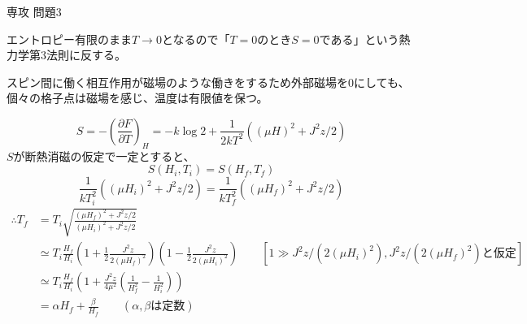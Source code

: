 \documentclass[fleqn]{jbook}
\begin{document}
\begin{answer}{専攻 問題3}
\begin{subanswers}
\SubAnswer
	エントロピー有限のまま$T \to 0$となるので「$T=0$のとき$S=0$である」という熱力学第3法則に反する。

\SubAnswer
スピン間に働く相互作用が磁場のような働きをするため外部磁場を0にしても、個々の格子点は磁場を感じ、温度は有限値を保つ。

\SubAnswer
	\[
	S = -\left( \frac{\partial F}{\partial T} \right)_H=-k\log 2 +\frac{1}{2kT^2}((\mu H)^2 +J^2z/2)
	\]
	$S$が断熱消磁の仮定で一定とすると、
	\[S(H_i,T_i)=S(H_f,T_f) \]
\[	\frac{1}{kT_i^2}((\mu H_i)^2+J^2z/2) = \frac{1}{kT_f^2}((\mu H_f)^2+J^2z/2) \]
	\begin{align*}
	\therefore T_f &= T_i\sqrt{\frac{(\mu H_f)^2+J^2z/2}{(\mu H_i)^2+J^2z/2}}\\
	&\simeq T_i\frac{H_f}{H_i}\left(1+\frac{1}{2}\frac{J^2z}{2(\mu H_f)^2}\right) \left( 1-\frac{1}{2}\frac{J^2z}{2(\mu H_i)^2} \right) \qquad [1 \gg J^2z/(2(\mu H_i)^2), J^2z/(2(\mu H_f)^2)と仮定]\\
	&\simeq T_i\frac{H_f}{H_i}\left( 1+\frac{J^2z}{4\mu ^2}\left(\frac{1}{H_f^2}-\frac{1}{H_i^2} \right) \right)\\
	&= \alpha H_f +\frac{\beta}{H_f} \qquad (\alpha, \beta は定数)
	\end{align*}\\



\end{subanswers}
\end{answer}
\end{document}
